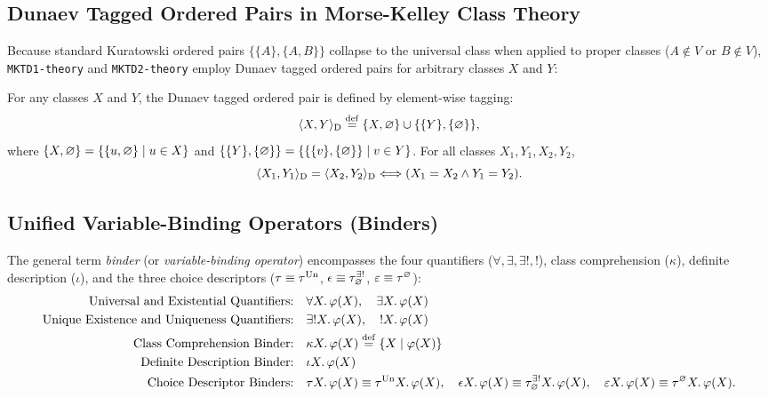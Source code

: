 \subsection{Dunaev Tagged Ordered Pairs in Morse-Kelley Class Theory}

Because standard Kuratowski ordered pairs $\{\{A\}, \{A, B\}\}$ collapse to the universal class when applied to proper classes ($A \notin V$ or $B \notin V$), \texttt{MKTD1-theory} and \texttt{MKTD2-theory} employ Dunaev tagged ordered pairs for arbitrary classes $X$ and $Y$:
\begin{theorem}
For any classes $X$ and $Y$, the Dunaev tagged ordered pair is defined by element-wise tagging:
\[
  \langle X , Y \rangle_{\mathrm{D}} \stackrel{\mathrm{def}}{=} \{X, \varnothing\} \cup \{\{Y\}, \{\varnothing\}\},
\]
where $\{X, \varnothing\} = \{\{u, \varnothing\} \mid u \in X\}$ and $\{\{Y\}, \{\varnothing\}\} = \{\{\{v\}, \{\varnothing\}\} \mid v \in Y\}$. For all classes $X_1, Y_1, X_2, Y_2$,
\[
  \langle X_1 , Y_1 \rangle_{\mathrm{D}} = \langle X_2 , Y_2 \rangle_{\mathrm{D}} \Longleftrightarrow (X_1 = X_2 \land Y_1 = Y_2).
\]
\end{theorem}

\subsection{Unified Variable-Binding Operators (Binders)}

The general term \emph{binder} (or \emph{variable-binding operator}) encompasses the four quantifiers ($\forall, \exists, \exists!, !$), class comprehension ($\kappa$), definite description ($\iota$), and the three choice descriptors ($\tau \equiv \tau^{\mathrm{Un}}$, $\epsilon \equiv \tau^{\exists!}_{\varnothing}$, $\varepsilon \equiv \tau^{\varnothing}$):
\begin{align*}
  \text{Universal and Existential Quantifiers:} &\quad \forall X.\, \varphi(X), \quad \exists X.\, \varphi(X) \\
  \text{Unique Existence and Uniqueness Quantifiers:} &\quad \exists! X.\, \varphi(X), \quad ! X.\, \varphi(X) \\
  \text{Class Comprehension Binder:} &\quad \kappa X.\, \varphi(X) \stackrel{\mathrm{def}}{=} \{X \mid \varphi(X)\} \\
  \text{Definite Description Binder:} &\quad \iota X.\, \varphi(X) \\
  \text{Choice Descriptor Binders:} &\quad \tau X.\, \varphi(X) \equiv \tau^{\mathrm{Un}} X.\,\varphi(X), \quad \epsilon X.\, \varphi(X) \equiv \tau^{\exists!}_{\varnothing} X.\,\varphi(X), \quad \varepsilon X.\, \varphi(X) \equiv \tau^{\varnothing} X.\,\varphi(X).
\end{align*}
